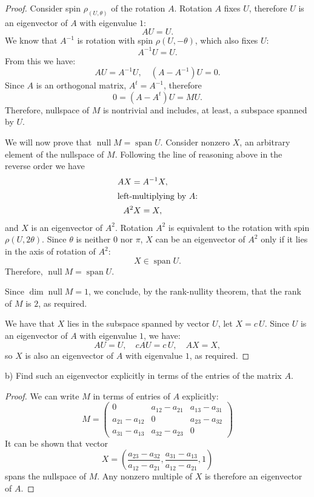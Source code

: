 \documentclass{article}
\theoremstyle{definition}
\DeclareMathOperator{\spn}{\operatorname{span}}
\DeclareMathOperator{\nll}{\operatorname{null}}
\begin{document}
\begin{proof}

Consider spin $\rho_{(U, \theta)}$ of the rotation $A$.
Rotation $A$ fixes $U$, therefore $U$ is an eigenvector of $A$ with eigenvalue $1$:
\[ AU = U. \]
We know that $A^{-1}$ is rotation with spin $\rho{(U,-\theta)}$, which also fixes $U$:
\[ A^{-1} U = U. \]
From this we have:
\[ AU = A^{-1} U, \quad (A - A^{-1})U = 0. \]
Since $A$ is an orthogonal matrix, $A^t = A^{-1}$, therefore
\[ 0 = (A - A^t)U = M U. \]
Therefore, nullspace of $M$ is nontrivial and includes, at least, a subspace spanned by $U$.

We will now prove that $\nll M = \spn U$.
Consider nonzero $X$, an arbitrary element of the nullspace of $M$.
Following the line of reasoning above in the reverse order we have
\begin{gather*}
    AX = A^{-1} X, \\
    \intertext{left-multiplying by $A$:}
    A^2 X = X,
\end{gather*}
and $X$ is an eigenvector of $A^2.$
Rotation $A^2$ is equivalent to the rotation with spin $\rho(U,2\theta)$. 
Since $\theta$ is neither $0$ nor $\pi$, $X$ can be an eigenvector of $A^2$ only if it lies in the axis of rotation of $A^2$:
\[ X \in \spn U. \]
Therefore, $\nll M = \spn U$.

Since $\dim \nll M = 1$, we conclude, by the rank-nullity theorem, that the rank of $M$ is $2$, as required.

We have that $X$ lies in the subspace spanned by vector $U$, let $X = c\,U$.
Since $U$ is an eigenvector of $A$ with eigenvalue $1$, we have:
\[ AU = U, \quad cAU = c\,U, \quad AX = X, \]
so $X$ is also an eigenvector of $A$ with eigenvalue $1$, as required.

\end{proof}

\begin{tcolorbox}
b) Find such an eigenvector explicitly in terms of the entries of the matrix $A$.
\end{tcolorbox}

\begin{proof}

We can write $M$ in terms of entries of $A$ explicitly:
\[
    M =    
    \begin{pmatrix}
    0 & a_{12} - a_{21} & a_{13} - a_{31} \\
    a_{21} - a_{12} & 0 & a_{23} - a_{32} \\
    a_{31} - a_{13} & a_{32} - a_{23} & 0
    \end{pmatrix}
\]
It can be shown that vector
\[ X = \left( \frac{a_{23} - a_{32}}{a_{12} - a_{21}}, \frac{a_{31}-a_{13}}{a_{12} - a_{21}}, 1 \right) \]
spans the nullspace of $M$.
Any nonzero multiple of $X$ is therefore an eigenvector of $A$.

\end{proof}
\end{document}
